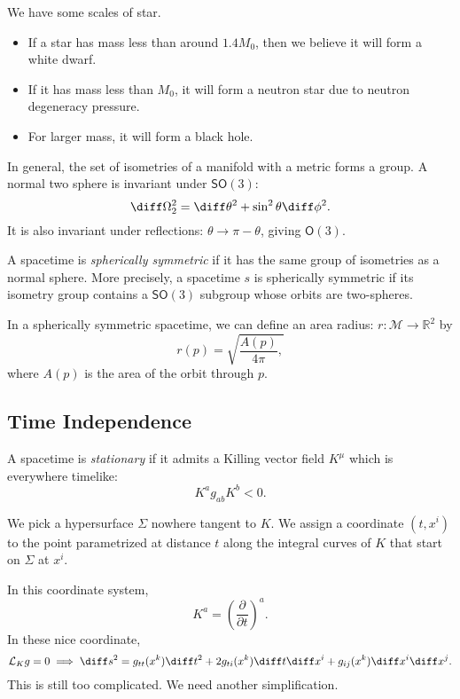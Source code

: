 \documentclass[12pt]{article}
\begin{document}
We have some scales of star.
\begin{itemize}
	\item If a star has mass less than around $1.4 M_0$, then we believe it will form a white dwarf.
	\item If it has mass less than $M_0$, it will form a neutron star due to neutron degeneracy pressure.
	\item For larger mass, it will form a black hole.
\end{itemize}

In general, the set of isometries of a manifold with a metric forms a group. A normal two sphere is invariant under $\mathsf{SO}(3)$:
\[
\diff \Omega_2^2 = \diff \theta^2 + \sin^2 \theta \diff \phi^2.
\]
It is also invariant under reflections: $\theta \to \pi - \theta$, giving $\mathsf{O}(3)$.

\begin{definition}
	A spacetime is \emph{spherically symmetric} if it has the same group of isometries as a normal sphere. More precisely, a spacetime $s$ is spherically symmetric if its isometry group contains a $\mathsf{SO}(3)$ subgroup whose orbits are two-spheres.
\end{definition}

In a spherically symmetric spacetime, we can define an area radius: $r : \mathcal{M} \to \mathbb{R}^2$ by 
\[
	r(p) = \sqrt{\frac{A(p)}{4 \pi},}
\]
where $A(p)$ is the area of the orbit through $p$.

\subsection{Time Independence}%
\label{sub:ti}

\begin{definition}
	A spacetime is \emph{stationary} if it admits a Killing vector field $K^\mu$ which is everywhere timelike:
	\[
	K^{a} g_{ab} K^{b} < 0.
	\]
\end{definition}

We pick a hypersurface $\Sigma$ nowhere tangent to $K$. We assign a coordinate $(t, x^i)$ to the point parametrized at distance $t$ along the integral curves of $K$ that start on $\Sigma$ at $x^{i}$.

In this coordinate system,
\[
K^a = \left( \frac{\partial}{\partial t}\right)^{a}.
\]
In these nice coordinate,
\[
\mathcal{L}_Kg = 0 \implies \diff s^2 = g_{tt} (x^k) \diff t^2 + 2 g_{ti} (x^k) \diff t \diff x^i + g_{ij}(x^k) \diff x^i \diff x^j.
\]
This is still too complicated. We need another simplification.
\end{document}
